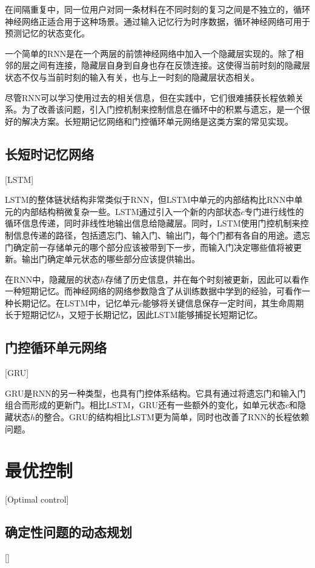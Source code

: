 在间隔重复中，同一位用户对同一条材料在不同时刻的复习之间是不独立的，循环神经网络正适合用于这种场景。通过输入记忆行为时序数据，循环神经网络可用于预测记忆的状态变化。

一个简单的RNN是在一个两层的前馈神经网络中加入一个隐藏层实现的。除了相邻的层之间有连接，隐藏层自身到自身也存在反馈连接。这使得当前时刻的隐藏层状态不仅与当前时刻的输入有关，也与上一时刻的隐藏层状态相关。

尽管RNN可以学习使用过去的相关信息，但在实践中，它们很难捕获长程依赖关系。为了改善该问题，引入门控机制来控制信息在循环中的积累与遗忘，是一个很好的解决方案。长短期记忆网络\cite{hochreiterLongShortTermMemory1997}和门控循环单元网络\cite{choPropertiesNeuralMachine2014}是这类方案的常见实现。

\subsection{长短时记忆网络}[LSTM]

LSTM的整体链状结构非常类似于RNN，但LSTM中单元的内部结构比RNN中单元的内部结构稍微复杂一些。LSTM通过引入一个新的内部状态$c$专门进行线性的循环信息传递，同时非线性地输出信息给隐藏层。同时，LSTM使用门控机制来控制信息传递的路径，包括遗忘门、输入门、输出门，每个门都有各自的用途。遗忘门确定前一存储单元的哪个部分应该被带到下一步，而输入门决定哪些值将被更新。输出门确定单元状态的哪些部分应该提供输出。

在RNN中，隐藏层的状态$h$存储了历史信息，并在每个时刻被更新，因此可以看作一种短期记忆。而神经网络的网络参数隐含了从训练数据中学到的经验，可看作一种长期记忆。在LSTM中，记忆单元$c$能够将关键信息保存一定时间，其生命周期长于短期记忆$h$，又短于长期记忆，因此LSTM能够捕捉长短期记忆。

\subsection{门控循环单元网络}[GRU]

GRU是RNN的另一种类型，也具有门控体系结构。它具有通过将遗忘门和输入门组合而形成的更新门。相比LSTM，GRU还有一些额外的变化，如单元状态$c$和隐藏状态$h$的整合。GRU的结构相比LSTM更为简单，同时也改善了RNN的长程依赖问题。

\section{最优控制}[Optimal control]

\subsection{确定性问题的动态规划}[]


